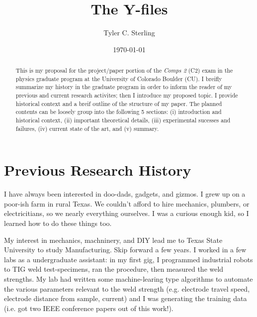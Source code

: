 \documentclass[prb,aps,11pt,superscriptaddress,floatfix]{revtex4-2}
\begin{document}
\title{The Y-files}

\author{Tyler C. Sterling}

\date{\today}

\begin{abstract}
This is my proposal for the project/paper portion of the \emph{Comps 2} (C2) exam in the physics graduate program at the University of Colorado Boulder (CU). I breifly summarize my history in the graduate program in order to inform the reader of my previous and current research activites; then I introduce my proposed topic. I provide historical context and a breif outline of the structure of my paper. The planned contents can be loosely group into the following 5 sections: (i) introduction and historical context, (ii) important theoretical details, (iii) experimental sucesses and failures, (iv) current state of the art, and (v) summary.  
\end{abstract}

\maketitle



\section{Previous Research History}
I have always been interested in doo-dads, gadgets, and gizmos. I grew up on a poor-ish farm in rural Texas. We couldn't afford to hire mechanics, plumbers, or electricitians, so we nearly everything ourselves. I was a curious enough kid, so I learned how to do these things too. 
    
My interest in mechanics, machninery, and DIY lead me to Texas State University to study Manufacturing. Skip forward a few years. I worked in a few labs as a undergraduate assistant: in my first gig, I programmed industrial robots to TIG weld test-specimens, ran the procedure, then measured the weld strengths. My lab had written some machine-learing type algorithms to automate the various parameters relevant to the weld strength (e.g. electrode travel speed, electrode distance from sample, current) and I was generating the training data (i.e. got two IEEE conference papers out of this work!). 
\end{document}
